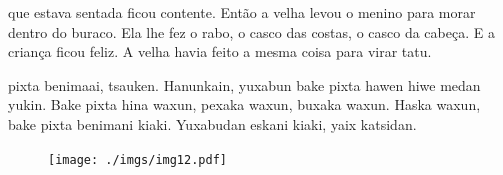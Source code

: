 
 que estava
sentada ficou contente.
Então a velha levou o menino
para morar dentro do buraco.
Ela lhe fez o rabo, o casco das
costas, o casco da cabeça.
E a criança ficou feliz.
A velha havia feito a mesma
coisa para virar tatu.

\vspace{2em}

 pixta benimaai, tsauken.
Hanunkain, yuxabun bake pixta
hawen hiwe medan yukin.
Bake pixta hina waxun, pexaka
waxun, buxaka waxun.
Haska waxun, bake pixta
benimani kiaki.
Yuxabudan eskani kiaki,
yaix katsidan.

\vspace*{\fill}

\pagebreak
\thispagestyle{empty}
\begin{figure}
\vspace*{-2cm}
\hspace*{-2.5cm}\texttt{[image: ./imgs/img12.pdf]}
\end{figure}

\chapter*{}

\mbox{}\vspace*{\fill}


